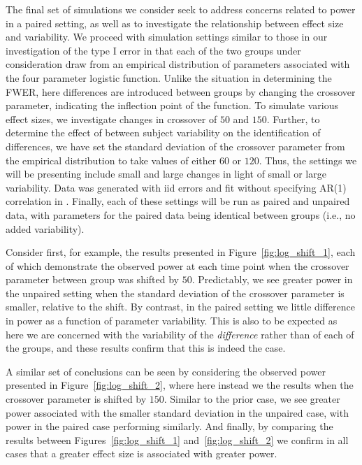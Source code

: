 
The final set of simulations we consider seek to address concerns related to power in a paired setting, as well as to investigate the relationship between effect size and variability. We proceed with simulation settings similar to those in our investigation of the type I error in that each of the two groups under consideration draw from an empirical distribution of parameters associated with the four parameter logistic function. Unlike the situation in determining the FWER, here differences are introduced between groups by changing the crossover parameter, indicating the inflection point of the function. To simulate various effect sizes, we investigate changes in crossover of $50$ and $150$. Further, to determine the effect of between subject variability on the identification of differences, we have set the standard deviation of the crossover parameter from the empirical distribution to take values of either $60$ or $120$. Thus, the settings we will be presenting include small and large changes in light of small or large variability. Data was generated with iid errors and fit without specifying AR(1) correlation in . Finally, each of these settings will be run as paired and unpaired data, with parameters for the paired data being identical between groups (i.e., no added variability). 


Consider first, for example, the results presented in Figure~\ref{fig:log_shift_1}, each of which demonstrate the observed power at each time point when the crossover parameter between group was shifted by $50$. Predictably, we see greater power in the unpaired setting when the standard deviation of the crossover parameter is smaller, relative to the shift. By contrast, in the paired setting we little difference in power as a function of parameter variability. This is also to be expected as here we are concerned with the variability of the \textit{difference} rather than of each of the groups, and these results confirm that this is indeed the case. 


A similar set of conclusions can be seen by considering the observed power presented in Figure~\ref{fig:log_shift_2}, where here instead we the results when the crossover parameter is shifted by $150$. Similar to the prior case, we see greater power associated with the smaller standard deviation in the unpaired case, with power in the paired case performing similarly. And finally, by comparing the results between Figures~\ref{fig:log_shift_1} and~\ref{fig:log_shift_2} we confirm in all cases that a greater effect size is associated with greater power. 

